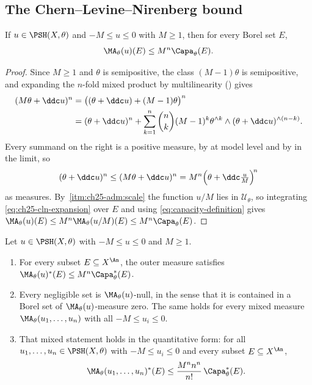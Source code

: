 \subsection{The Chern--Levine--Nirenberg bound}
\label{sec:ch25-cln}

\begin{lemma}
\label{lem:ma-capacity-bound}
If $u\in\PSH(X,\theta)$ and $-M\leq u\leq0$ with $M\geq1$, then for
every Borel set $E$,
\begin{equation}
\label{eq:ma-capacity-bound}
                       \MA_\theta(u)(E)
                       \leq M^n\Capa_\theta(E).
\end{equation}
\end{lemma}

\begin{proof}
Since $M\geq1$ and $\theta$ is semipositive, the class
$(M-1)\theta$ is semipositive, and expanding the $n$-fold mixed product
by multilinearity () gives
\[
 \begin{aligned}
 (M\theta+\ddc u)^n
 &=\bigl((\theta+\ddc u)+(M-1)\theta\bigr)^n\\
 &=(\theta+\ddc u)^n+\sum_{k=1}^n\binom nk(M-1)^k
   \theta^{\wedge k}\wedge(\theta+\ddc u)^{\wedge(n-k)} .
 \end{aligned}
\]
Every summand on the right is a positive measure, by
 at model level and by
 in the limit, so
\begin{equation}
\label{eq:ch25-cln-expansion}
 (\theta+\ddc u)^n\leq(M\theta+\ddc u)^n
 =M^n\Bigl(\theta+\ddc\tfrac uM\Bigr)^{\! n}
\end{equation}
as measures.  By
\,\cref{itm:ch25-adm:scale} the function
$u/M$ lies in $\mathcal U_\theta$, so integrating
\eqref{eq:ch25-cln-expansion} over $E$ and using
\eqref{eq:capacity-definition} gives
$\MA_\theta(u)(E)\leq M^n\MA_\theta(u/M)(E)\leq M^n\Capa_\theta(E)$.
\end{proof}

\begin{corollary}
\label{cor:ch25-outer-ma-bound}
Let $u\in\PSH(X,\theta)$ with $-M\leq u\leq0$ and $M\geq1$.
\begin{enumerate}
\item\label{itm:ch25-om:outer}
 For every subset $E\subseteq X^{\An}$, the outer measure satisfies
 $\MA_\theta(u)^*(E)\leq M^n\Capa_\theta^*(E)$.
\item\label{itm:ch25-om:null}
 Every negligible set is $\MA_\theta(u)$-null, in the sense that it is
 contained in a Borel set of $\MA_\theta(u)$-measure zero.  The same holds
 for every mixed measure $\MA_\theta(u_1,\ldots,u_n)$ with all
 $-M\leq u_i\leq0$.
\item\label{itm:ch25-om:mixed}
 That mixed statement holds in the quantitative form: for all
 $u_1,\ldots,u_n\in\PSH(X,\theta)$ with $-M\leq u_i\leq0$ and every
 subset $E\subseteq X^{\An}$,
 \[
  \MA_\theta(u_1,\ldots,u_n)^*(E)
  \leq\frac{M^nn^n}{n!}\,\Capa^*_\theta(E).
 \]
\end{enumerate}
\end{corollary}

